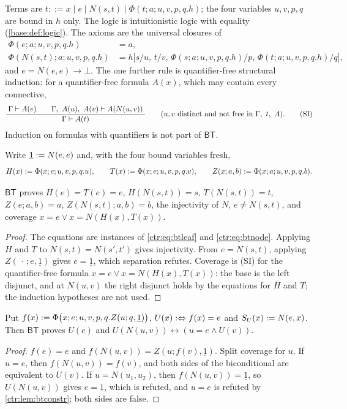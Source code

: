 \begin{definition}\label{ctr:def:bt}
Terms are $t ::= x\mid e\mid N(s,t)\mid \Phi(t;a;u,v,p,q.h)$; the four variables $u,v,p,q$ are
bound in $h$ only. The logic is intuitionistic logic with equality (\cref{base:def:logic}).
The axioms are the universal closures of
\begin{align}
 \Phi(e;a;u,v,p,q.h)&=a, \label{ctr:eq:btleaf}\\
 \Phi(N(s,t);a;u,v,p,q.h)&=h\bigl[s/u,\,t/v,\,\Phi(s;a;u,v,p,q.h)/p,\,\Phi(t;a;u,v,p,q.h)/q\bigr],
 \label{ctr:eq:btnode}
\end{align}
and $e=N(e,e)\to\bot$. The one further rule is quantifier-free structural induction: for a
quantifier-free formula $A(x)$, which may contain every connective,
\[
 \infrule{\Gamma\proves A(e)\qquad\Gamma,\ A(u),\ A(v)\proves A(N(u,v))}{\Gamma\proves A(t)}
 \qquad(u,v\text{ distinct and not free in }\Gamma,\ t,\ A).
 \tag{SI}
\]
Induction on formulas with quantifiers is not part of $\mathsf{BT}$.
\end{definition}

Write $\underline 1\mathrel{:=} N(e,e)$ and, with the four bound variables fresh,
\[
 H(x)\mathrel{:=}\Phi(x;e;u,v,p,q.u),\qquad T(x)\mathrel{:=}\Phi(x;e;u,v,p,q.v),\qquad
 Z(x;a,b)\mathrel{:=}\Phi(x;a;u,v,p,q.b).
\]

\begin{lemma}[Constructors]\label{ctr:lem:btconstr}
$\mathsf{BT}$ proves $H(e)=T(e)=e$, $H(N(s,t))=s$, $T(N(s,t))=t$, $Z(e;a,b)=a$,
$Z(N(s,t);a,b)=b$, the injectivity of $N$, $e\neq N(s,t)$, and coverage
$x=e\lor x=N(H(x),T(x))$.
\end{lemma}
\begin{proof}
The equations are instances of \eqref{ctr:eq:btleaf} and \eqref{ctr:eq:btnode}. Applying $H$
and $T$ to $N(s,t)=N(s',t')$ gives injectivity. From $e=N(s,t)$, applying $Z(\,\cdot\,;e,\underline 1)$
gives $e=\underline 1$, which separation refutes. Coverage is (SI) for the quantifier-free
formula $x=e\lor x=N(H(x),T(x))$: the base is the left disjunct, and at $N(u,v)$ the right
disjunct holds by the equations for $H$ and $T$; the induction hypotheses are not used.
\end{proof}

\begin{lemma}\label{ctr:lem:btunary}
Put $f(x)\mathrel{:=}\Phi\bigl(x;e;u,v,p,q.Z(u;q,\underline 1)\bigr)$, $U(x)\mathrel{:\Leftrightarrow} f(x)=e$ and
$S_U(x)\mathrel{:=} N(e,x)$. Then $\mathsf{BT}$ proves $U(e)$ and
$U(N(u,v))\leftrightarrow(u=e\land U(v))$.
\end{lemma}
\begin{proof}
$f(e)=e$ and $f(N(u,v))=Z(u;f(v),\underline 1)$. Split coverage for $u$. If $u=e$, then
$f(N(u,v))=f(v)$, and both sides of the biconditional are equivalent to $U(v)$. If
$u=N(u_1,u_2)$, then $f(N(u,v))=\underline 1$, so $U(N(u,v))$ gives $e=\underline 1$, which is
refuted, and $u=e$ is refuted by \cref{ctr:lem:btconstr}; both sides are false.
\end{proof}

